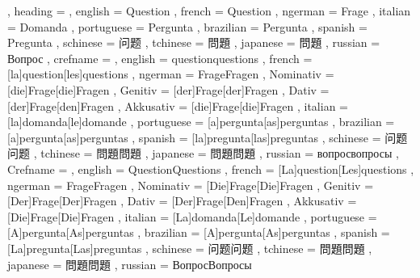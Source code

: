   {
    , heading =   {
                    , english     = Question
                    , french      = Question
                    , ngerman     = Frage
                    , italian     = Domanda
                    , portuguese  = Pergunta
                    , brazilian   = Pergunta
                    , spanish     = Pregunta
                    , schinese    = 问题
                    , tchinese    = 問題
                    , japanese    = 問題
                    , russian     = Вопрос
                  }
    , crefname =  {
                    , english     = {question}{questions}
                    , french      = [la]{question}[les]{questions}
                    , ngerman     = { {Frage}{Fragen}
                                      , Nominativ = [die]{Frage}[die]{Fragen}
                                      , Genitiv   = [der]{Frage}[der]{Fragen}
                                      , Dativ     = [der]{Frage}[den]{Fragen}
                                      , Akkusativ = [die]{Frage}[die]{Fragen}
                                    }
                    , italian     = [la]{domanda}[le]{domande}
                    , portuguese  = [a]{pergunta}[as]{perguntas}
                    , brazilian   = [a]{pergunta}[as]{perguntas}
                    , spanish     = [la]{pregunta}[las]{preguntas}
                    , schinese    = {问题}{问题}
                    , tchinese    = {問題}{問題}
                    , japanese    = {問題}{問題}
                    , russian     = {вопрос}{вопросы}
                  }
    , Crefname =  {
                    , english     = {Question}{Questions}
                    , french      = [La]{question}[Les]{questions}
                    , ngerman     = { {Frage}{Fragen}
                                      , Nominativ = [Die]{Frage}[Die]{Fragen}
                                      , Genitiv   = [Der]{Frage}[Der]{Fragen}
                                      , Dativ     = [Der]{Frage}[Den]{Fragen}
                                      , Akkusativ = [Die]{Frage}[Die]{Fragen}
                                    }
                    , italian     = [La]{domanda}[Le]{domande}
                    , portuguese  = [A]{pergunta}[As]{perguntas}
                    , brazilian   = [A]{pergunta}[As]{perguntas}
                    , spanish     = [La]{pregunta}[Las]{preguntas}
                    , schinese    = {问题}{问题}
                    , tchinese    = {問題}{問題}
                    , japanese    = {問題}{問題}
                    , russian     = {Вопрос}{Вопросы}
                  }
  }

